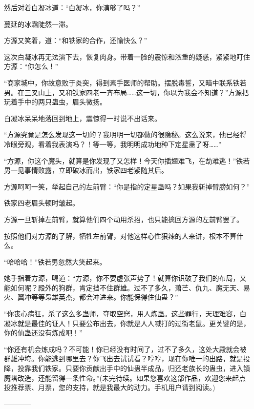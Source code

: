 \begin{this_body}
然后对着白凝冰道：“白凝冰，你演够了吗？”

蔓延的冰霜陡然一滞。

方源又笑着，道：“和铁家的合作，还愉快么？”

这次白凝冰再无法演下去，恢复肉身。带着一脸的震惊和浓重的疑惑，紧紧地盯住方源：“你怎么！”

“商家城中，你故意败于炎突，得到素手医师的帮助。摆脱毒誓，又暗中联系铁若男。在三叉山上，又和铁家四老一齐布局……这一切，你以为我会不知道？”方源把玩着手中的两只蛊虫，眉头微扬。

白凝冰呆呆地落回到地上，震惊得一时说不出话来。

“方源究竟是怎么发现这一切的？我明明一切都做的很隐秘。这么说来，他已经将冷眼旁观，看着我表演吗？！等一等，我明明成功地种下定星蛊了呀……”

“方源，你这个魔头，就算是你发现了又怎样！今天你插翅难飞，在劫难逃！”铁若男一见事情败露，立即破冰而出，铁家四老紧随其后。

方源呵呵一笑，举起自己的左前臂：“你是指的定星蛊吗？如果我斩掉臂膀如何？”

铁家四老眉头顿时皱起。

方源一旦斩掉左前臂，就算他们四个动用杀招，也只能擒回方源的左前臂罢了。

按照他们对方源的了解，牺牲左前臂，对他这样心性狠辣的人来讲，根本不算什么。

“哈哈哈！”铁若男忽然大笑起来。

她手指着方源，喝道：“方源，你不要虚张声势了！就算你识破了我们的布局，又能如何呢？殿外的狗群，肯定挡不住群雄。过不了多久，萧芒、仇九、魔无天、易火、翼冲等等枭雄英杰，都会冲进来。你能保得住仙蛊？”

“你丧心病狂，杀了这么多蛊师，夺取空窍，用人炼蛊。这些罪行，天理难容，白凝冰就是最佳的证人！只要公布出去，你就是人人喊打的过街老鼠。更关键的是，你的仙蛊还没有炼成吧！”

“你还有机会炼成吗？不可能！你已经没有时间了，过不了多久，这处大殿就会被群雄冲垮。你能逃到哪里去？你飞出去试试看？哼哼，现在你唯一的出路，就是投降，投靠我们铁家。只要你贡献出手中的仙蛊半成品，归还老族长的蛊虫，进入镇魔塔改造，还能留得一条性命。”(未完待续。如果您喜欢这部作品，欢迎您来起点投推荐票、月票，您的支持，就是我最大的动力。手机用户请到阅读。)

------------

\end{this_body}

